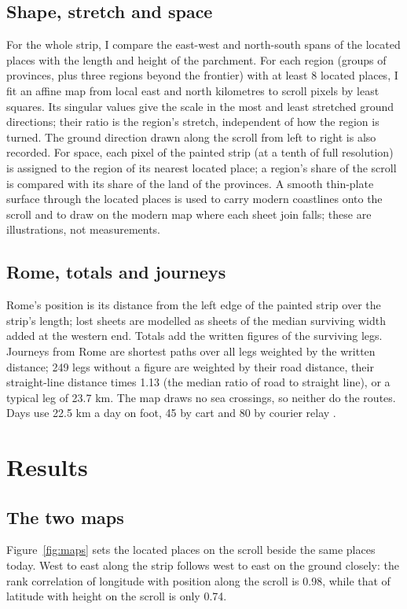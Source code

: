 \documentclass[11pt,a4paper]{article}
\begin{document}
\subsection{Shape, stretch and space}
For the whole strip, I compare the east-west and north-south spans of the located places with the length and height of the parchment. For each region (groups of provinces, plus three regions beyond the frontier) with at least 8 located places, I fit an affine map from local east and north kilometres to scroll pixels by least squares. Its singular values give the scale in the most and least stretched ground directions; their ratio is the region's stretch, independent of how the region is turned. The ground direction drawn along the scroll from left to right is also recorded. For space, each pixel of the painted strip (at a tenth of full resolution) is assigned to the region of its nearest located place; a region's share of the scroll is compared with its share of the land of the provinces. A smooth thin-plate surface through the located places is used to carry modern coastlines onto the scroll and to draw on the modern map where each sheet join falls; these are illustrations, not measurements.

\subsection{Rome, totals and journeys}
Rome's position is its distance from the left edge of the painted strip over the strip's length; lost sheets are modelled as sheets of the median surviving width added at the western end. Totals add the written figures of the surviving legs. Journeys from Rome are shortest paths over all legs weighted by the written distance; 249 legs without a figure are weighted by their road distance, their straight-line distance times 1.13 (the median ratio of road to straight line), or a typical leg of 23.7 km. The map draws no sea crossings, so neither do the routes. Days use 22.5 km a day on foot, 45 by cart and 80 by courier relay \citep{wiki}.

\section{Results}
\subsection{The two maps}
Figure~\ref{fig:maps} sets the located places on the scroll beside the same places today. West to east along the strip follows west to east on the ground closely: the rank correlation of longitude with position along the scroll is 0.98, while that of latitude with height on the scroll is only 0.74.
\end{document}
